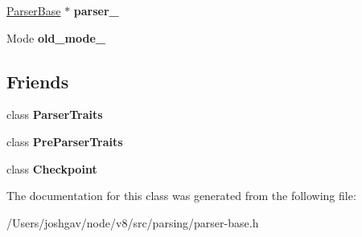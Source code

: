 \begin{DoxyCompactItemize}
\item 
\hyperlink{classv8_1_1internal_1_1_parser_base}{Parser\+Base} $\ast$ {\bfseries parser\+\_\+}\hypertarget{classv8_1_1internal_1_1_parser_base_1_1_b_a_s_e___e_m_b_e_d_d_e_d_a54e61f71ad3262f0f7035a5e26122896}{}\label{classv8_1_1internal_1_1_parser_base_1_1_b_a_s_e___e_m_b_e_d_d_e_d_a54e61f71ad3262f0f7035a5e26122896}

\item 
Mode {\bfseries old\+\_\+mode\+\_\+}\hypertarget{classv8_1_1internal_1_1_parser_base_1_1_b_a_s_e___e_m_b_e_d_d_e_d_a6d58ef12c8b12b7f649a03b4f4f7fd28}{}\label{classv8_1_1internal_1_1_parser_base_1_1_b_a_s_e___e_m_b_e_d_d_e_d_a6d58ef12c8b12b7f649a03b4f4f7fd28}

\end{DoxyCompactItemize}
\subsection*{Friends}
\begin{DoxyCompactItemize}
\item 
class {\bfseries Parser\+Traits}\hypertarget{classv8_1_1internal_1_1_parser_base_1_1_b_a_s_e___e_m_b_e_d_d_e_d_a5f14c645eff20b2a5bad62347cde341c}{}\label{classv8_1_1internal_1_1_parser_base_1_1_b_a_s_e___e_m_b_e_d_d_e_d_a5f14c645eff20b2a5bad62347cde341c}

\item 
class {\bfseries Pre\+Parser\+Traits}\hypertarget{classv8_1_1internal_1_1_parser_base_1_1_b_a_s_e___e_m_b_e_d_d_e_d_a13cc2d699d49f893ee3824107270498e}{}\label{classv8_1_1internal_1_1_parser_base_1_1_b_a_s_e___e_m_b_e_d_d_e_d_a13cc2d699d49f893ee3824107270498e}

\item 
class {\bfseries Checkpoint}\hypertarget{classv8_1_1internal_1_1_parser_base_1_1_b_a_s_e___e_m_b_e_d_d_e_d_a91368e0e09c8602b0d1df10a13a3fb81}{}\label{classv8_1_1internal_1_1_parser_base_1_1_b_a_s_e___e_m_b_e_d_d_e_d_a91368e0e09c8602b0d1df10a13a3fb81}

\end{DoxyCompactItemize}


The documentation for this class was generated from the following file\+:\begin{DoxyCompactItemize}
\item 
/\+Users/joshgav/node/v8/src/parsing/parser-\/base.\+h\end{DoxyCompactItemize}

